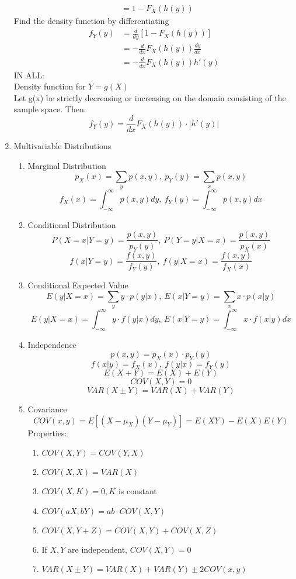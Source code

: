 \documentclass[10pt]{article}
\begin{document}
\begin{multicols}{2}
\begin{enumerate}
\begin{align*}
				&= 1 - F_X(h(y))
			\end{align*}
			Find the density function by differentiating
			\begin{align*}
				f_Y(y) &= \frac{d}{dy}[1-F_X(h(y))]\\
				&= -\frac{d}{dx}F_X(h(y))\frac{dy}{dx}\\
				&= -\frac{d}{dx}F_X(h(y))h'(y)
			\end{align*}
			IN ALL:\\
			Density function for $Y = g(X)$\\
			Let g(x) be strictly decreasing or increasing on the domain consisting of the sample space. Then:
			$$f_Y(y) = \frac{d}{dx}F_X(h(y)) \cdot |h'(y)|$$
			\item Multivariable Distributions
			\begin{enumerate}
				\item Marginal Distribution
				$$p_X(x)=\sum_{y}p(x,y), \ p_Y(y)=\sum_{x}p(x,y) $$
				$$f_X(x) = \int_{-\infty}^{\infty}p(x,y)dy, \ f_Y(y) = \int_{-\infty}^{\infty}p(x,y)dx$$
				\item Conditional Distribution
				$$P(X = x|Y = y) = \frac{p(x,y)}{p_Y(y)}, \ P(Y = y|X = x) = \frac{p(x,y)}{p_X(x)}$$
				$$f(x|Y=y)=\frac{f(x,y)}{f_Y(y)}, \ f(y|X=x)=\frac{f(x,y)}{f_X(x)}$$
				\item Conditional Expected Value
				$$E(y|X=x) = \sum_{y}y\cdot p(y|x), \ E(x|Y=y) = \sum_{x}x\cdot p(x|y)$$
				$$E(y|X=x) = \int_{-\infty}^{\infty}y\cdot f(y|x)dy, \ E(x|Y=y) = \int_{-\infty}^{\infty}x\cdot f(x|y)dx$$
				\item Independence
				$$p(x,y) = p_X(x) \cdot p_Y(y)$$
				$$f(x|y) = f_X(x), \ f(y|x) = f_Y(y)$$
				$$E(X+Y) = E(X)+E(Y)$$
				$$COV(X,Y) = 0$$
				$$VAR(X \pm Y) = VAR(X) + VAR(Y)$$
				\item Covariance
				$$COV(x,y) = E[(X-\mu_X)(Y-\mu_Y)] = E(XY) - E(X)E(Y)$$
				Properties:
				\begin{enumerate}
					\item $COV(X,Y) = COV(Y,X)$
					\item $COV(X,X) = VAR(X)$
					\item $COV(X,K) = 0, K$ is constant
					\item $COV(aX,bY) = ab\cdot COV(X,Y)$
					\item $COV(X,Y+Z) = COV(X,Y) + COV(X,Z)$
					\item If $X, Y$ are independent, $COV(X,Y) = 0$
					\item $VAR(X\pm Y) = VAR(X) + VAR(Y) \pm 2COV(x,y)$
				\end{enumerate}

\end{enumerate}
\end{enumerate}
\end{multicols}
\end{document}
